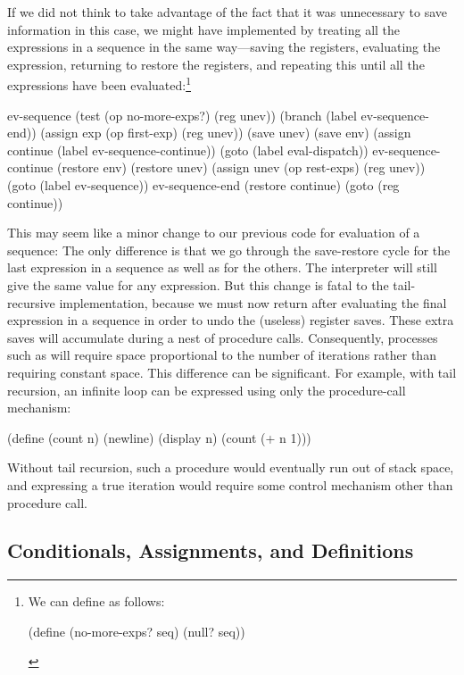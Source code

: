 If we did not think to take advantage of the fact that it was unnecessary to
save information in this case, we might have implemented 
by treating all the expressions in a sequence in the same way---saving the
registers, evaluating the expression, returning to restore the registers, and
repeating this until all the expressions have been evaluated:\footnote{We can
define  as follows:

\begin{compactCodeBlock}
(define (no-more-exps? seq) (null? seq))
\end{compactCodeBlock}
}

\begin{codeBlock}
ev-sequence
  (test (op no-more-exps?) (reg unev))
  (branch (label ev-sequence-end))
  (assign exp (op first-exp) (reg unev))
  (save unev)
  (save env)
  (assign continue (label ev-sequence-continue))
  (goto (label eval-dispatch))
ev-sequence-continue
  (restore env)
  (restore unev)
  (assign unev (op rest-exps) (reg unev))
  (goto (label ev-sequence))
ev-sequence-end
  (restore continue)
  (goto (reg continue))
\end{codeBlock}

\noindent
This may seem like a minor change to our previous code for evaluation of a
sequence: The only difference is that we go through the save-restore cycle for
the last expression in a sequence as well as for the others.  The interpreter
will still give the same value for any expression.  But this change is fatal to
the tail-recursive implementation, because we must now return after evaluating
the final expression in a sequence in order to undo the (useless) register
saves.  These extra saves will accumulate during a nest of procedure calls.
Consequently, processes such as  will require space
proportional to the number of iterations rather than requiring constant space.
This difference can be significant.  For example, with tail recursion, an
infinite loop can be expressed using only the procedure-call mechanism:

\begin{codeBlock}
(define (count n)
  (newline) (display n) (count (+ n 1)))
\end{codeBlock}

\noindent
Without tail recursion, such a procedure would eventually run out of stack
space, and expressing a true iteration would require some control mechanism
other than procedure call.

\subsection{Conditionals, Assignments, and Definitions}
\label{Section 5.4.3}

